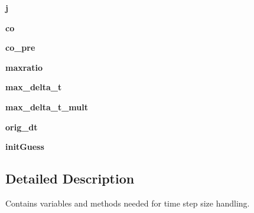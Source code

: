 \begin{DoxyCompactItemize}
\item 
\hypertarget{classmain__src_8old_1_1courant_1_1Courant_a964b68ed18f05cdbeeed4c3553e4dcfc}{{\bfseries j}}\label{classmain__src_8old_1_1courant_1_1Courant_a964b68ed18f05cdbeeed4c3553e4dcfc}

\item 
\hypertarget{classmain__src_8old_1_1courant_1_1Courant_ab928e8c2d8d13cf7b067ebf0b3070575}{{\bfseries co}}\label{classmain__src_8old_1_1courant_1_1Courant_ab928e8c2d8d13cf7b067ebf0b3070575}

\item 
\hypertarget{classmain__src_8old_1_1courant_1_1Courant_ab12ebc1f4443e3405c3cdfb72215a113}{{\bfseries co\-\_\-pre}}\label{classmain__src_8old_1_1courant_1_1Courant_ab12ebc1f4443e3405c3cdfb72215a113}

\item 
\hypertarget{classmain__src_8old_1_1courant_1_1Courant_a894f6cf1ce962f91168dc3dd303d1382}{{\bfseries maxratio}}\label{classmain__src_8old_1_1courant_1_1Courant_a894f6cf1ce962f91168dc3dd303d1382}

\item 
\hypertarget{classmain__src_8old_1_1courant_1_1Courant_aa402482762ed08118e9eb6871b9c5322}{{\bfseries max\-\_\-delta\-\_\-t}}\label{classmain__src_8old_1_1courant_1_1Courant_aa402482762ed08118e9eb6871b9c5322}

\item 
\hypertarget{classmain__src_8old_1_1courant_1_1Courant_afa228a37d904f9245192c6fdca31fcb9}{{\bfseries max\-\_\-delta\-\_\-t\-\_\-mult}}\label{classmain__src_8old_1_1courant_1_1Courant_afa228a37d904f9245192c6fdca31fcb9}

\item 
\hypertarget{classmain__src_8old_1_1courant_1_1Courant_a6261e2e33ccfb13eefc0235dec24a070}{{\bfseries orig\-\_\-dt}}\label{classmain__src_8old_1_1courant_1_1Courant_a6261e2e33ccfb13eefc0235dec24a070}

\item 
\hypertarget{classmain__src_8old_1_1courant_1_1Courant_a8971521ad8c1584490a8ab5f1e6efe66}{{\bfseries init\-Guess}}\label{classmain__src_8old_1_1courant_1_1Courant_a8971521ad8c1584490a8ab5f1e6efe66}

\end{DoxyCompactItemize}


\subsection{Detailed Description}
Contains variables and methods needed for time step size handling. 



